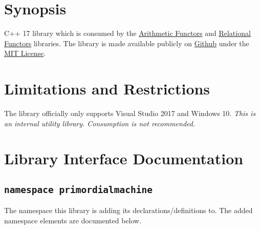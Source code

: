 \documentclass[oneside]{book}
\begin{document}
\frontmatter

\begin{titlepage}
\maketitle
\end{titlepage}

\tableofcontents
{}

\mainmatter

\chapter{Synopsis}
C++ 17 library which is consumed by the
\href{https://github.com/primordialmachine/arithmetic-functors}{Arithmetic Functors}
and
\href{https://github.com/primordialmachine/relational-functors}{Relational Functors}
libraries.
The library is made available publicly on
\href{\GetLibraryRepository}{Github}
under the
\href{\GetLibraryRepository/blob/master/LICENSE}{MIT License}.

\chapter{Limitations and Restrictions}
The library officially only supports Visual Studio 2017 and Windows 10.
\textit{\color{orange}This is an internal utility library.
                      Consumption is not recommended.}




\chapter{Library Interface Documentation}

\section{\texttt{namespace primordialmachine}}
The namespace this library is adding its declarations/definitions to.
The added namespace elements are documented below.\newline
\end{document}
